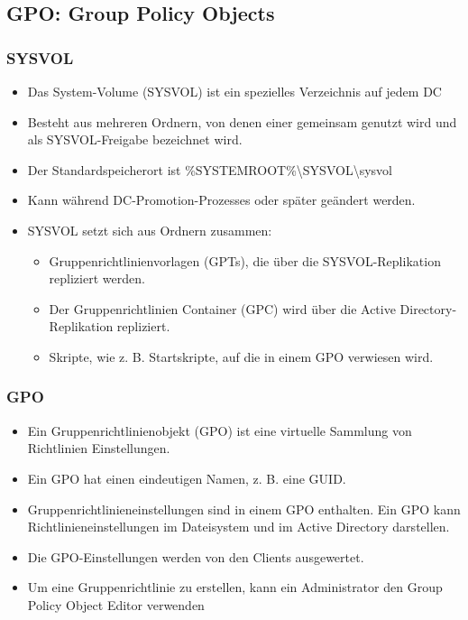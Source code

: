 \subsection{GPO: Group Policy Objects}\label{subsec:gpo:-group-policy-objects}

\subsubsection{SYSVOL}
\begin{itemize}
    \item Das System-Volume (SYSVOL) ist ein spezielles Verzeichnis auf jedem DC
    \item Besteht aus mehreren Ordnern, von denen einer gemeinsam genutzt wird und als SYSVOL-Freigabe bezeichnet wird.
    \item Der Standardspeicherort ist \%SYSTEMROOT\%\textbackslash SYSVOL\textbackslash sysvol
    \item Kann während DC-Promotion-Prozesses oder später geändert werden.
    \item SYSVOL setzt sich aus Ordnern zusammen:
    \begin{itemize}
        \item Gruppenrichtlinienvorlagen (GPTs), die über die SYSVOL-Replikation repliziert werden.
        \item Der Gruppenrichtlinien Container (GPC) wird über die Active Directory-Replikation repliziert.
        \item Skripte, wie z. B. Startskripte, auf die in einem GPO verwiesen wird.
    \end{itemize}
\end{itemize}

\subsubsection{GPO}
\begin{itemize}
    \item Ein Gruppenrichtlinienobjekt (GPO) ist eine virtuelle Sammlung von Richtlinien Einstellungen.
    \item Ein GPO hat einen eindeutigen Namen, z. B. eine GUID.
    \item Gruppenrichtlinieneinstellungen sind in einem GPO enthalten. Ein GPO kann Richtlinieneinstellungen im Dateisystem und im Active Directory darstellen.
    \item Die GPO-Einstellungen werden von den Clients ausgewertet.
    \item Um eine Gruppenrichtlinie zu erstellen, kann ein Administrator den Group Policy Object Editor verwenden
\end{itemize}

